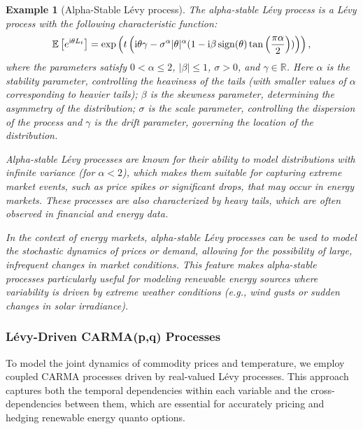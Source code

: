 \documentclass[10pt,a4paper,reqno]{amsart}
\theoremstyle{example}
\newtheorem{example}[theorem]{Example}
\newcommand*\I{\mathop{}\!\textnormal{i}}
\begin{document}
\begin{example}[Alpha-Stable Lévy process]
The alpha-stable Lévy process is a Lévy process with the following characteristic function:
\begin{align*}
\mathbb{E}\left[ e^{\I \theta L_t} \right] = \exp\left( t \left( \I \theta
  \gamma - \sigma^\alpha |\theta|^\alpha (1 - \I \beta
  \operatorname{sign}(\theta) \tan\left(\frac{\pi \alpha}{2}\right)) \right)
  \right),   
\end{align*}
where the parameters satisfy $0 < \alpha \leq 2$, $|\beta| \leq 1$, $\sigma >
0$, and $\gamma \in \mathbb{R}$. Here  $\alpha$ is the stability parameter,
controlling the heaviness of the tails (with smaller values of $\alpha$
corresponding to heavier tails); $\beta$ is the skewness parameter, determining
the asymmetry of the distribution; $\sigma$ is the scale parameter, controlling
the dispersion of the process and $\gamma$ is the drift parameter, governing the
location of the distribution.\par{}

Alpha-stable Lévy processes are known for their ability to model distributions
with infinite variance (for $\alpha < 2$), which makes them suitable for
capturing extreme market events, such as price spikes or significant drops, that
may occur in energy markets. These processes are also characterized by heavy
tails, which are often observed in financial and energy data.

In the context of energy markets, alpha-stable Lévy processes can be used to
model the stochastic dynamics of prices or demand, allowing for the possibility
of large, infrequent changes in market conditions. This feature makes
alpha-stable processes particularly useful for modeling renewable energy sources
where variability is driven by extreme weather conditions (e.g., wind gusts or
sudden changes in solar irradiance).
\end{example}

\subsubsection{L\'evy-Driven CARMA(p,q) Processes}

To model the joint dynamics of commodity prices and temperature, we employ coupled CARMA processes driven by real-valued L\'evy processes. This approach captures both the temporal dependencies within each variable and the cross-dependencies between them, which are essential for accurately pricing and hedging renewable energy quanto options.
\end{document}
